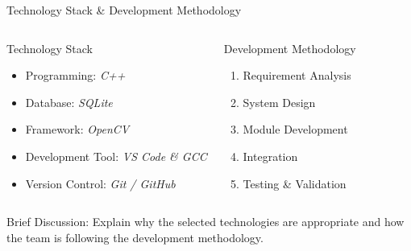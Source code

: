 \documentclass[aspectratio=169,11pt]{beamer}
\newcommand{\smallnote}[1]{%
\vspace{0.08cm}
{\scriptsize\color{GEUGrey}#1}
}
\newcommand{\placeholder}[1]{%
\textit{\color{GEUGrey}#1}
}
\begin{document}
\begin{frame}{Technology Stack \& Development Methodology}

\begin{columns}[T,totalwidth=\textwidth]


\begin{block}{Technology Stack}

\begin{itemize}\itemsep2pt
\item Programming: \placeholder{C++}
\item Database: \placeholder{SQLite}
\item Framework: \placeholder{OpenCV}
\item Development Tool: \placeholder{VS Code \& GCC}
\item Version Control: \placeholder{Git / GitHub}
\end{itemize}

\end{block}


\begin{block}{Development Methodology}

\begin{enumerate}\itemsep2pt
\item Requirement Analysis
\item System Design
\item Module Development
\item Integration
\item Testing \& Validation
\end{enumerate}

\end{block}

\end{columns}

\vfill

\smallnote{
Brief Discussion: Explain why the selected technologies are appropriate
and how the team is following the development methodology.
}

\end{frame}
\end{document}
